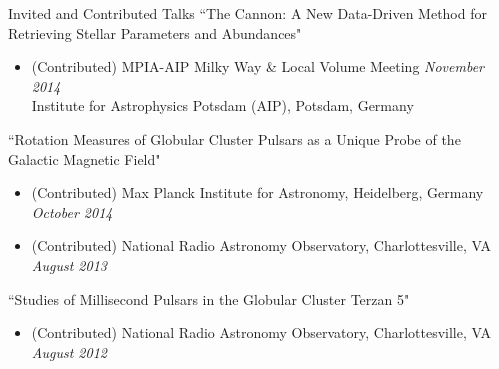 \documentclass{resume} %
\begin{document}
\begin{rSection}{Invited and Contributed Talks}
``The Cannon: A New Data-Driven Method for Retrieving Stellar Parameters and Abundances"
\begin{itemize}
\item
(Contributed) MPIA-AIP Milky Way \& Local Volume Meeting  \hfill {\em November 2014} \\
Institute for Astrophysics Potsdam (AIP), Potsdam, Germany
\end{itemize}

``Rotation Measures of Globular Cluster Pulsars as a Unique Probe of the Galactic Magnetic Field"
\begin{itemize}
\item
(Contributed) Max Planck Institute for Astronomy,
Heidelberg, Germany \hfill {\em October 2014}
\item
(Contributed) National Radio Astronomy Observatory, 
Charlottesville, VA \hfill {\em August 2013} 
\end{itemize}


``Studies of Millisecond Pulsars in the Globular Cluster Terzan 5" 
\begin{itemize}
\item
(Contributed) National Radio Astronomy Observatory, 
Charlottesville, VA \hfill {\em August 2012} 
\end{itemize}

\end{rSection}

\end{document}
